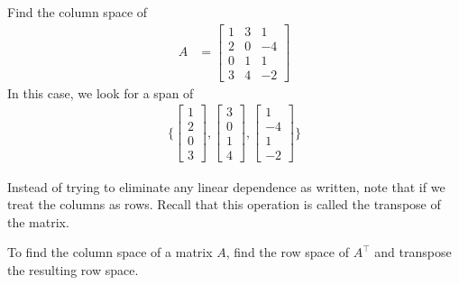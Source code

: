 \begin{example}
Find the column space of 
%
\begin{align*} A & =
\begin{bmatrix} %
1 & 3 & 1\\
2 & 0 &  -4\\
0 & 1 & 1 \\
3 & 4 & -2
\end{bmatrix}
\end{align*}
In this case, we look for a span of 
%
\begin{align*}
\{ \begin{bmatrix}
1 \\ 2 \\ 0 \\ 3
\end{bmatrix}, \begin{bmatrix}
3 \\ 0 \\ 1 \\ 4
\end{bmatrix}, 
\begin{bmatrix}
1 \\ -4 \\ 1 \\ -2 
\end{bmatrix} \}
\end{align*}

\end{example}

Instead of trying to eliminate any linear dependence as written, note that if we treat the columns as rows.  Recall that this operation is called the transpose of the matrix. 

\begin{Boxed*}
To find the column space of a matrix $A$, find the row space of $A^{\intercal}$ and transpose the resulting row space. 
\end{Boxed*}

